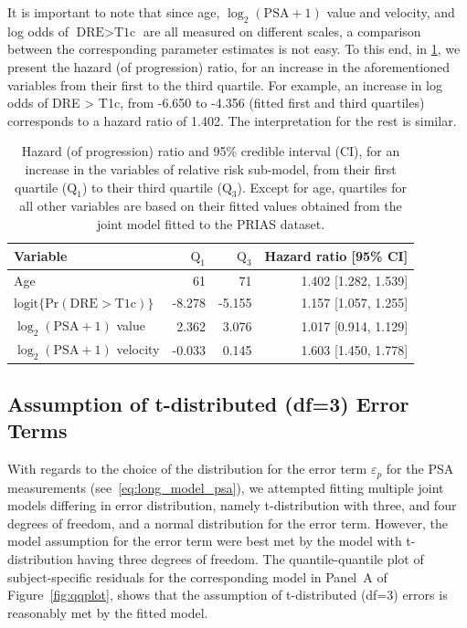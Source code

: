 It is important to note that since age, ${\log_2 (\mbox{PSA} + 1)}$ value and velocity, and log odds of ${\mbox{DRE} > \mbox{T1c}}$ are all measured on different scales, a comparison between the corresponding parameter estimates is not easy. To this end, in \ref{tab:DRE_PSA_survival_easy}, we present the hazard (of progression) ratio, for an increase in the aforementioned variables from their first to the third quartile. For example, an increase in log odds of DRE > T1c, from -6.650 to -4.356 (fitted first and third quartiles) corresponds to a hazard ratio of 1.402. The interpretation for the rest is similar.

\begin{table}[!htb]
\begin{center}
\caption{Hazard (of progression) ratio and 95\% credible interval (CI), for an increase in the variables of relative risk sub-model, from their first quartile ($\mbox{Q}_1$) to their third quartile ($\mbox{Q}_3$). Except for age, quartiles for all other variables are based on their fitted values obtained from the joint model fitted to the PRIAS dataset.}
\label{tab:DRE_PSA_survival_easy}
\begin{tabular}{lrrr}
\hline
\hline
Variable                      & $\mbox{Q}_1$   & $\mbox{Q}_3$ & Hazard ratio [95\% CI] \\
\hline
Age & 61 & 71 & 1.402 [1.282, 1.539] \\
$\mbox{logit} \big\{\mbox{Pr}(\mbox{DRE} > \mbox{T1c})\big\}$ & -8.278 & -5.155 & 1.157 [1.057, 1.255]\\
$\log_2 (\mbox{PSA} + 1)$ value & 2.362 & 3.076 & 1.017 [0.914, 1.129]\\
$\log_2 (\mbox{PSA} + 1)$ velocity & -0.033 & 0.145 & 1.603 [1.450, 1.778]\\
\hline
\end{tabular}
\end{center}
\end{table}

\clearpage

\subsection{Assumption of t-distributed (df=3) Error Terms}
\label{subsec:t-dist-assumption}
With regards to the choice of the distribution for the error term $\varepsilon_p$ for the PSA measurements (see~\ref{eq:long_model_psa}), we attempted fitting multiple joint models differing in error distribution, namely t-distribution with three, and four degrees of freedom, and a normal distribution for the error term. However, the model assumption for the error term were best met by the model with t-distribution having three degrees of freedom. The quantile-quantile plot of subject-specific residuals for the corresponding model in Panel~A of Figure~\ref{fig:qqplot}, shows that the assumption of t-distributed (df=3) errors is reasonably met by the fitted model. 

